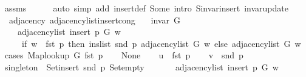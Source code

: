 \begin{isabellebody}
\ assms\isanewline
\ \ \ \ \isamarkupfalse%
\ {\isacharparenleft}{\kern0pt}auto\ simp\ add{\isacharcolon}{\kern0pt}\ insert{\isacharunderscore}{\kern0pt}def\ Some\ intro{\isacharcolon}{\kern0pt}\ S{\isachardot}{\kern0pt}invar{\isacharunderscore}{\kern0pt}insert\ invar{\isacharunderscore}{\kern0pt}update{\isacharparenright}{\kern0pt}\isanewline
{}\isamarkupfalse%
%
\endisatagproof
{\isafoldproof}%
%
\isadelimproof
\isanewline
%
\endisadelimproof
\isanewline
{}\isamarkupfalse%
\ {\isacharparenleft}{\kern0pt}\ adjacency{\isacharparenright}{\kern0pt}\ adjacency{\isacharunderscore}{\kern0pt}list{\isacharunderscore}{\kern0pt}insert{\isacharunderscore}{\kern0pt}cong{\isacharcolon}{\kern0pt}\isanewline
\ \ \ {\isachardoublequoteopen}invar\ G{\isachardoublequoteclose}\isanewline
\ \ \isanewline
\ \ \ \ {\isachardoublequoteopen}adjacency{\isacharunderscore}{\kern0pt}list\ {\isacharparenleft}{\kern0pt}insert\ p\ G{\isacharparenright}{\kern0pt}\ w\ {\isacharequal}{\kern0pt}\isanewline
\ \ \ \ \ {\isacharparenleft}{\kern0pt}if\ w\ {\isacharequal}{\kern0pt}\ fst\ p\ then\ ins{\isacharunderscore}{\kern0pt}list\ {\isacharparenleft}{\kern0pt}snd\ p{\isacharparenright}{\kern0pt}\ {\isacharparenleft}{\kern0pt}adjacency{\isacharunderscore}{\kern0pt}list\ G\ w{\isacharparenright}{\kern0pt}\ else\ adjacency{\isacharunderscore}{\kern0pt}list\ G\ w{\isacharparenright}{\kern0pt}{\isachardoublequoteclose}\isanewline
%
\isadelimproof
%
\endisadelimproof
%
\isatagproof
{}\isamarkupfalse%
\ {\isacharparenleft}{\kern0pt}cases\ {\isachardoublequoteopen}Map{\isacharunderscore}{\kern0pt}lookup\ G\ {\isacharparenleft}{\kern0pt}fst\ p{\isacharparenright}{\kern0pt}{\isachardoublequoteclose}{\isacharparenright}{\kern0pt}\isanewline
\ \ \isamarkupfalse%
\ None\isanewline
\ \ \isamarkupfalse%
\ {\isacharquery}{\kern0pt}u\ {\isacharequal}{\kern0pt}\ {\isachardoublequoteopen}fst\ p{\isachardoublequoteclose}\isanewline
\ \ \isamarkupfalse%
\ {\isacharquery}{\kern0pt}v\ {\isacharequal}{\kern0pt}\ {\isachardoublequoteopen}snd\ p{\isachardoublequoteclose}\isanewline
\ \ \isamarkupfalse%
\ {\isacharquery}{\kern0pt}singleton\ {\isacharequal}{\kern0pt}\ {\isachardoublequoteopen}Set{\isacharunderscore}{\kern0pt}insert\ {\isacharparenleft}{\kern0pt}snd\ p{\isacharparenright}{\kern0pt}\ Set{\isacharunderscore}{\kern0pt}empty{\isachardoublequoteclose}\isanewline
\ \ \isamarkupfalse%
\isanewline
\ \ \ \ {\isachardoublequoteopen}adjacency{\isacharunderscore}{\kern0pt}list\ {\isacharparenleft}{\kern0pt}insert\ p\ G{\isacharparenright}{\kern0pt}\ w\ {\isacharequal}{\kern0pt}\isanewline

\end{isabellebody}
